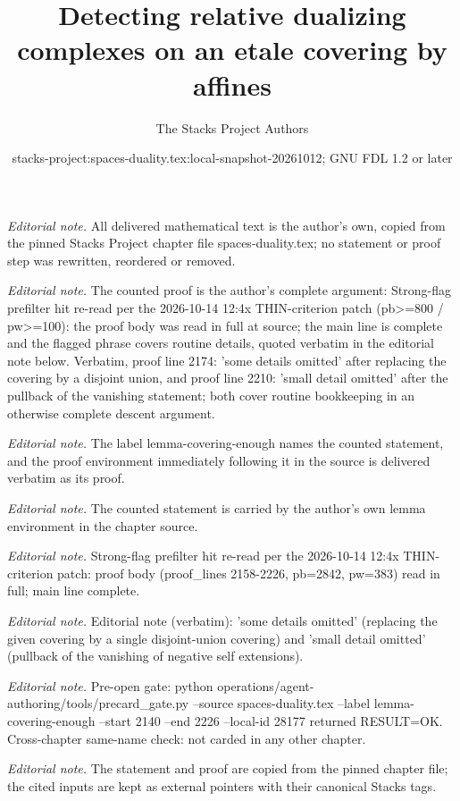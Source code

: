 \documentclass[10pt,a4paper]{amsart}
\title{Detecting relative dualizing complexes on an etale covering by affines}
\author{The Stacks Project Authors}
\date{stacks-project:spaces-duality.tex:local-snapshot-20261012; GNU FDL 1.2 or later}
\theoremstyle{plain}
\theoremstyle{definition}
\theoremstyle{remark}
\numberwithin{equation}{subsection}
\begin{document}
\maketitle
\noindent\textit{Editorial note.} All delivered mathematical text is the author's own, copied from the pinned Stacks Project chapter file spaces-duality.tex; no statement or proof step was rewritten, reordered or removed.\par\medskip
\noindent\textit{Editorial note.} The counted proof is the author's complete argument: Strong-flag prefilter hit re-read per the 2026-10-14 12:4x THIN-criterion patch (pb>=800 / pw>=100): the proof body was read in full at source; the main line is complete and the flagged phrase covers routine details, quoted verbatim in the editorial note below. Verbatim, proof line 2174: 'some details omitted' after replacing the covering by a disjoint union, and proof line 2210: 'small detail omitted' after the pullback of the vanishing statement; both cover routine bookkeeping in an otherwise complete descent argument.\par\medskip
\noindent\textit{Editorial note.} The label lemma-covering-enough names the counted statement, and the proof environment immediately following it in the source is delivered verbatim as its proof.\par\medskip
\noindent\textit{Editorial note.} The counted statement is carried by the author's own lemma environment in the chapter source.\par\medskip
\noindent\textit{Editorial note.} Strong-flag prefilter hit re-read per the 2026-10-14 12:4x THIN-criterion patch: proof body (proof\_lines 2158-2226, pb=2842, pw=383) read in full; main line complete.\par\medskip
\noindent\textit{Editorial note.} Editorial note (verbatim): 'some details omitted' (replacing the given covering by a single disjoint-union covering) and 'small detail omitted' (pullback of the vanishing of negative self extensions).\par\medskip
\noindent\textit{Editorial note.} Pre-open gate: python operations/agent-authoring/tools/precard\_gate.py --source spaces-duality.tex --label lemma-covering-enough --start 2140 --end 2226 --local-id 28177 returned RESULT=OK. Cross-chapter same-name check: not carded in any other chapter.\par\medskip
\noindent\textit{Editorial note.} The statement and proof are copied from the pinned chapter file; the cited inputs are kept as external pointers with their canonical Stacks tags.\par\medskip
\end{document}
